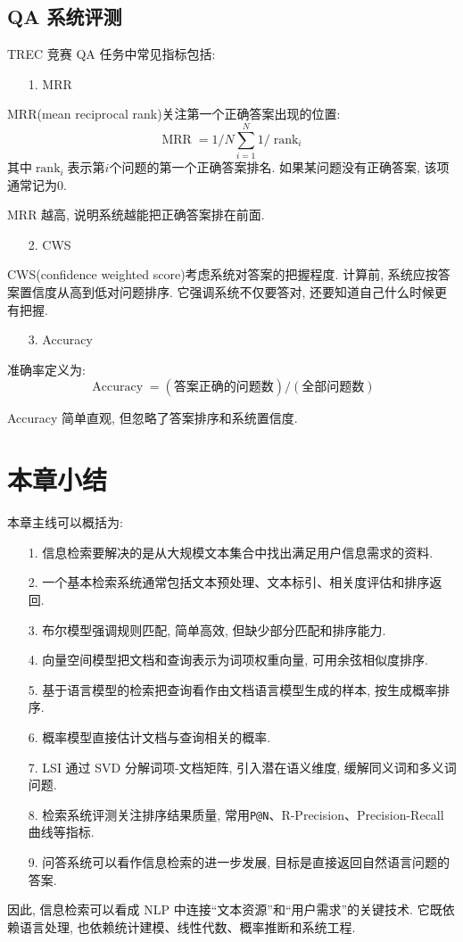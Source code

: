 \subsection{QA 系统评测}


TREC 竞赛 QA 任务中常见指标包括:

\begin{enumerate}
\item[1.] MRR
\end{enumerate}

MRR(mean reciprocal rank)关注第一个正确答案出现的位置:
\[
\operatorname{MRR} = 1/N \sum_{i=1}^N 1/\operatorname{rank}_i
\]
其中$\operatorname{rank}_i$表示第$i$个问题的第一个正确答案排名.
如果某问题没有正确答案, 该项通常记为$0$.

MRR 越高, 说明系统越能把正确答案排在前面.

\begin{enumerate}
\item[2.] CWS
\end{enumerate}

CWS(confidence weighted score)考虑系统对答案的把握程度.
计算前, 系统应按答案置信度从高到低对问题排序.
它强调系统不仅要答对, 还要知道自己什么时候更有把握.

\begin{enumerate}
\item[3.] Accuracy
\end{enumerate}

准确率定义为:
\[
\operatorname{Accuracy}
  = (\text{答案正确的问题数}) / (\text{全部问题数})
\]

Accuracy 简单直观, 但忽略了答案排序和系统置信度.

\section{本章小结}


本章主线可以概括为:

\begin{enumerate}
\item[1.] 信息检索要解决的是从大规模文本集合中找出满足用户信息需求的资料.
\item[2.] 一个基本检索系统通常包括文本预处理、文本标引、相关度评估和排序返回.
\item[3.] 布尔模型强调规则匹配, 简单高效, 但缺少部分匹配和排序能力.
\item[4.] 向量空间模型把文档和查询表示为词项权重向量, 可用余弦相似度排序.
\item[5.] 基于语言模型的检索把查询看作由文档语言模型生成的样本, 按生成概率排序.
\item[6.] 概率模型直接估计文档与查询相关的概率.
\item[7.] LSI 通过 SVD 分解词项-文档矩阵, 引入潜在语义维度, 缓解同义词和多义词问题.
\item[8.] 检索系统评测关注排序结果质量, 常用\texttt{P@N}、R-Precision、Precision-Recall 曲线等指标.
\item[9.] 问答系统可以看作信息检索的进一步发展, 目标是直接返回自然语言问题的答案.
\end{enumerate}

因此, 信息检索可以看成 NLP 中连接“文本资源”和“用户需求”的关键技术.
它既依赖语言处理, 也依赖统计建模、线性代数、概率推断和系统工程.
